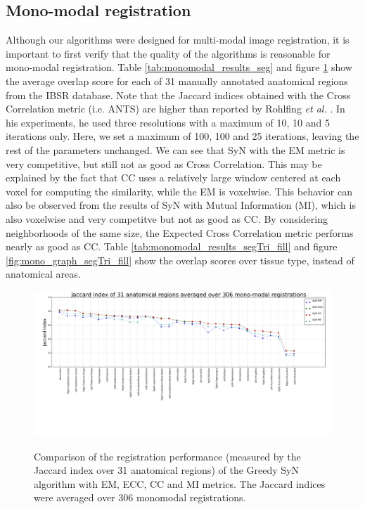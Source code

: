 \subsection{Mono-modal registration}
Although our algorithms were designed for multi-modal image registration, it is important to first verify that the quality of the algorithms is reasonable for mono-modal registration.
Table \ref{tab:monomodal_results_seg} and figure \ref{fig:mono_graph_seg} show the average overlap score for each of 31 manually annotated anatomical regions from the IBSR database.
Note that the Jaccard indices obtained with the Cross Correlation metric (i.e. ANTS) are higher than reported by Rohlfing {\it et al.} \cite{Rohlfing2012}. In his experiments, he used
three resolutions with a maximum of 10, 10 and 5 iterations only. Here, we set a maximum of 100, 100 and 25 iterations, leaving the rest of the parameters
unchanged. We can see that SyN with the EM metric is very competitive, but still not as good as Cross Correlation. This may be explained by the fact that CC uses a relatively large
window centered at each voxel for computing the similarity, while the EM is voxelwise. This behavior can also be observed from the results of SyN with Mutual Information (MI), which is also
voxelwise and very competitve but not as good as CC. By considering neighborhoods of the same size, the Expected Cross Correlation metric performs
nearly as good as CC. Table \ref{tab:monomodal_results_segTri_fill} and figure \ref{fig:mono_graph_segTri_fill} show the overlap scores over tissue type, instead of anatomical areas.




\begin{figure}[H]
\centering
\includegraphics[width=1.0\linewidth]{./images/mono_lines_seg.png}\\
\caption{Comparison of the registration performance (measured by the Jaccard index over 31 anatomical regions) of the Greedy SyN algorithm with EM, ECC, CC and MI metrics. The Jaccard
indices were averaged over 306 monomodal registrations.}
\label{fig:mono_graph_seg}
\end{figure}

